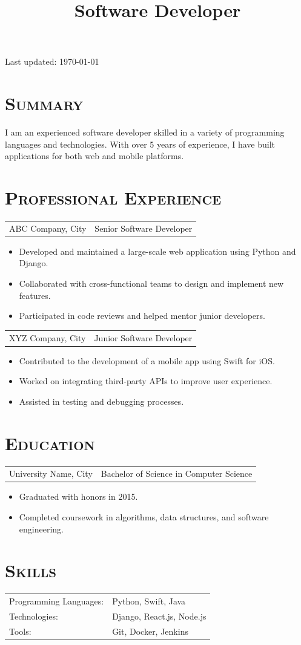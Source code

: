 \documentclass[11pt,a4paper,sans]{moderncv}
\title{Software Developer} %
\newcommand*{\cvdate}[1]{\section*{\textsc{#1}}}
\newcommand*{\cvevent}[3]{
    \vspace{0.5em}
    \begin{tabular}{rl}
        \small #2 & \small #1 \\
    \end{tabular}\par
}
\begin{document}

{\footnotesize Last updated: \today}
{}

\cvdate{Summary}
\smallskip
\noindent I am an experienced software developer skilled in a variety of programming languages and technologies. With over 5 years of experience, I have built applications for both web and mobile platforms.

\cvdate{Professional Experience}

\cvevent{Senior Software Developer}{ABC Company, City}{}{}
\begin{itemize}
    \item Developed and maintained a large-scale web application using Python and Django.
    \item Collaborated with cross-functional teams to design and implement new features.
    \item Participated in code reviews and helped mentor junior developers.
\end{itemize}

\cvevent{Junior Software Developer}{XYZ Company, City}{}{}
\begin{itemize}
    \item Contributed to the development of a mobile app using Swift for iOS.
    \item Worked on integrating third-party APIs to improve user experience.
    \item Assisted in testing and debugging processes.
\end{itemize}

\cvdate{Education}

\cvevent{Bachelor of Science in Computer Science}{University Name, City}{}{}
\begin{itemize}
    \item Graduated with honors in 2015.
    \item Completed coursework in algorithms, data structures, and software engineering.
\end{itemize}

\cvdate{Skills}

\smallskip
\begin{tabular}{ll}
    Programming Languages: & Python, Swift, Java \\
    Technologies: & Django, React.js, Node.js \\
    Tools: & Git, Docker, Jenkins \\
\end{tabular}


\end{document}
